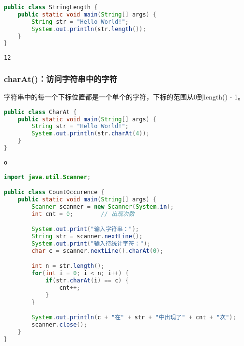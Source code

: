 \begin{lstlisting}[language=Java]
public class StringLength {
	public static void main(String[] args) {
		String str = "Hello World!";
		System.out.println(str.length());
	}
}
\end{lstlisting}

\begin{tcolorbox}
	\begin{verbatim}
12
	\end{verbatim}
\end{tcolorbox}

\subsubsection{charAt()：访问字符串中的字符}

字符串中的每一个下标位置都是一个单个的字符，下标的范围从0到length() - 1。

\vspace{0.5cm}


\begin{lstlisting}[language=Java]
public class CharAt {
	public static void main(String[] args) {
		String str = "Hello World!";
		System.out.println(str.charAt(4));
	}
}
\end{lstlisting}

\begin{tcolorbox}
	\begin{verbatim}
o
	\end{verbatim}
\end{tcolorbox}

\vspace{0.5cm}


\begin{lstlisting}[language=Java]
import java.util.Scanner;

public class CountOccurence {
	public static void main(String[] args) {
		Scanner scanner = new Scanner(System.in);
		int cnt = 0;		// 出现次数

		System.out.print("输入字符串：");
		String str = scanner.nextLine();
		System.out.print("输入待统计字符：");
		char c = scanner.nextLine().charAt(0);

		int n = str.length();
		for(int i = 0; i < n; i++) {
			if(str.charAt(i) == c) {
				cnt++;
			}
		}

		System.out.println(c + "在" + str + "中出现了" + cnt + "次");
		scanner.close();
	}
}
\end{lstlisting}


